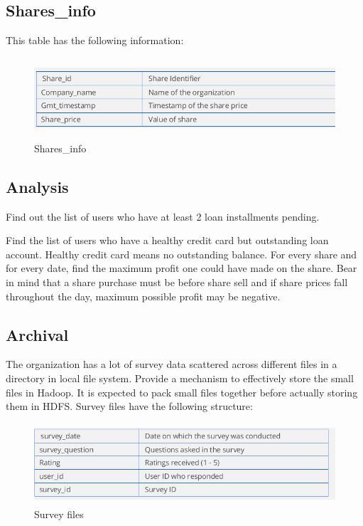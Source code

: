\subsection{Shares\_info}
This table has the following information:
\begin{figure}[H]
\centering
\includegraphics[width=12cm,height=3cm]{sharesinfo1.png}
    \caption{Shares\_info}
\end{figure}
\newline
\subsection{Analysis}
\item Find out the list of users who have at least 2 loan installments pending.
\item Find the list of users who have a healthy credit card but outstanding loan
account.
\items Healthy credit card means no outstanding balance.
\newline For every share and for every date, find the maximum profit one could
have made on the share. Bear in mind that a share purchase must be
before share sell and if share prices fall throughout the day, maximum
possible profit may be negative. \newpage
\subsection{Archival}
The organization has a lot of survey data scattered across different files in
a directory in local file system. Provide a mechanism to effectively store the
small files in Hadoop. It is expected to pack small files together before
actually storing them in HDFS.\newline
Survey files have the following structure:
\begin{figure}[H]
\centering
\includegraphics[width=12cm,height=3cm]{surveyfile.png}
    \caption{Survey files}
\end{figure}
\newpage











